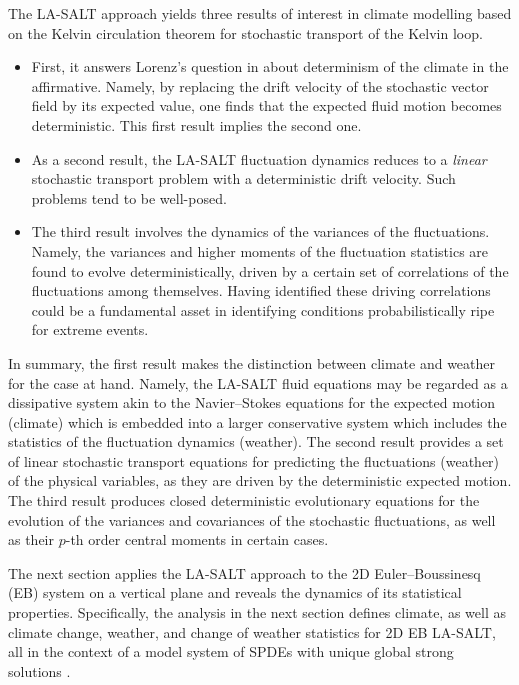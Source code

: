 \documentclass[11pt, oneside]{article}   	%
\numberwithin{equation}{section}
\theoremstyle{plain}
\theoremstyle{definition}
\theoremstyle{remark}
\newcommand{\<}{\langle}
\renewcommand{\>}{\rangle}
\begin{document}
The LA-SALT approach yields three results of interest in climate modelling based on the Kelvin circulation theorem for stochastic transport of the Kelvin loop. 
\begin{itemize}
\item
First, it answers Lorenz's question in \cite{Lorenz1995} about determinism of the climate in the affirmative. Namely, by replacing the drift velocity of the stochastic vector field by its expected value, one finds that the expected fluid motion becomes deterministic. This first result implies the second one.
\item
As a second result, the LA-SALT fluctuation dynamics reduces to a \emph{linear} stochastic transport problem with a deterministic drift velocity.  Such problems tend to be well-posed. 
\item
The third result involves the dynamics of the variances of the fluctuations. Namely, the variances and higher moments of the fluctuation statistics are found to evolve deterministically, driven by a certain set of correlations of the fluctuations among themselves. 
Having identified these driving correlations could be a fundamental asset in identifying conditions probabilistically ripe for extreme events.
\end{itemize}
In summary, the first result makes the distinction between climate and weather for the case at hand. Namely, the LA-SALT fluid equations may be regarded as a dissipative system akin to the Navier--Stokes equations for the expected motion (climate) which is embedded into a larger conservative system which includes the statistics of the fluctuation dynamics (weather). The second result provides a set of linear stochastic transport equations for predicting the fluctuations (weather) of the physical variables, as they are driven by the deterministic expected motion. The third result produces closed deterministic evolutionary equations for the evolution of the variances and covariances of the stochastic fluctuations, as well as their $p$-th order central moments in certain cases. 


The next section applies the LA-SALT approach to the 2D Euler--Boussinesq (EB) system on a vertical plane and reveals the dynamics of its statistical properties. Specifically, the analysis in the next section defines climate, as well as climate change, weather, and change of weather statistics for 2D EB LA-SALT, all in the context of a model system of SPDEs with unique global strong solutions \cite{alonso2020modelling}.
\end{document}
